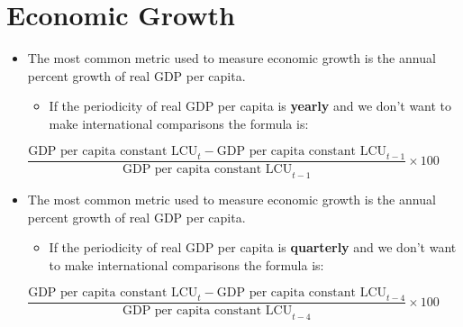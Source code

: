 \documentclass[
  ignorenonframetext,
]{beamer}
\providecommand{\tightlist}{%
  \setlength{\itemsep}{0pt}\setlength{\parskip}{0pt}}\usepackage{longtable,booktabs,array}
\begin{document}
\section{Economic Growth}\label{economic-growth}

\begin{frame}{}
\label{section-16}
\begin{itemize}
\item
  The most common metric used to measure economic growth is the annual
  percent growth of real GDP per capita.

  \begin{itemize}
  \tightlist
  \item
    If the periodicity of real GDP per capita is \textbf{yearly} and we
    don't want to make international comparisons the formula is:
  \end{itemize}
\end{itemize}

\[\frac{\text{GDP per capita constant LCU}_t - \text{GDP per capita constant LCU}_{t-1}}{\text{GDP per capita constant LCU}_{t-1}} \times 100\]
\end{frame}

\begin{frame}{}
\label{section-17}
\begin{itemize}
\item
  The most common metric used to measure economic growth is the annual
  percent growth of real GDP per capita.

  \begin{itemize}
  \tightlist
  \item
    If the periodicity of real GDP per capita is \textbf{quarterly} and
    we don't want to make international comparisons the formula is:
  \end{itemize}
\end{itemize}

\[\frac{\text{GDP per capita constant LCU}_t - \text{GDP per capita constant LCU}_{t-4}}{\text{GDP per capita constant LCU}_{t-4}} \times 100\]
\end{frame}
\end{document}
